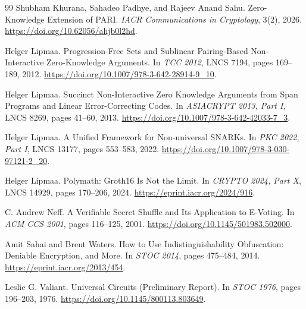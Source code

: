 \documentclass[11pt]{article}
\theoremstyle{definition}
\begin{document}
\begin{thebibliography}{99}
Shubham Khurana, Sahadeo Padhye, and Rajeev Anand Sahu.
\newblock Zero-Knowledge Extension of PARI.
\newblock \emph{IACR Communications in Cryptology}, 3(2), 2026.
\newblock \url{https://doi.org/10.62056/ahjb0l2hd}.

Helger Lipmaa.
\newblock Progression-Free Sets and Sublinear Pairing-Based Non-Interactive
Zero-Knowledge Arguments.
\newblock In \emph{TCC 2012}, LNCS 7194, pages 169--189, 2012.
\newblock \url{https://doi.org/10.1007/978-3-642-28914-9_10}.

Helger Lipmaa.
\newblock Succinct Non-Interactive Zero Knowledge Arguments from Span
Programs and Linear Error-Correcting Codes.
\newblock In \emph{ASIACRYPT 2013, Part I}, LNCS 8269, pages 41--60, 2013.
\newblock \url{https://doi.org/10.1007/978-3-642-42033-7_3}.

Helger Lipmaa.
\newblock A Unified Framework for Non-universal SNARKs.
\newblock In \emph{PKC 2022, Part I}, LNCS 13177, pages 553--583, 2022.
\newblock \url{https://doi.org/10.1007/978-3-030-97121-2_20}.

Helger Lipmaa.
\newblock Polymath: Groth16 Is Not the Limit.
\newblock In \emph{CRYPTO 2024, Part X}, LNCS 14929, pages 170--206, 2024.
\newblock \url{https://eprint.iacr.org/2024/916}.

C. Andrew Neff.
\newblock A Verifiable Secret Shuffle and Its Application to E-Voting.
\newblock In \emph{ACM CCS 2001}, pages 116--125, 2001.
\newblock \url{https://doi.org/10.1145/501983.502000}.

Amit Sahai and Brent Waters.
\newblock How to Use Indistinguishability Obfuscation: Deniable Encryption,
and More.
\newblock In \emph{STOC 2014}, pages 475--484, 2014.
\newblock \url{https://eprint.iacr.org/2013/454}.

Leslie G. Valiant.
\newblock Universal Circuits (Preliminary Report).
\newblock In \emph{STOC 1976}, pages 196--203, 1976.
\newblock \url{https://doi.org/10.1145/800113.803649}.

\end{thebibliography}
\end{document}
